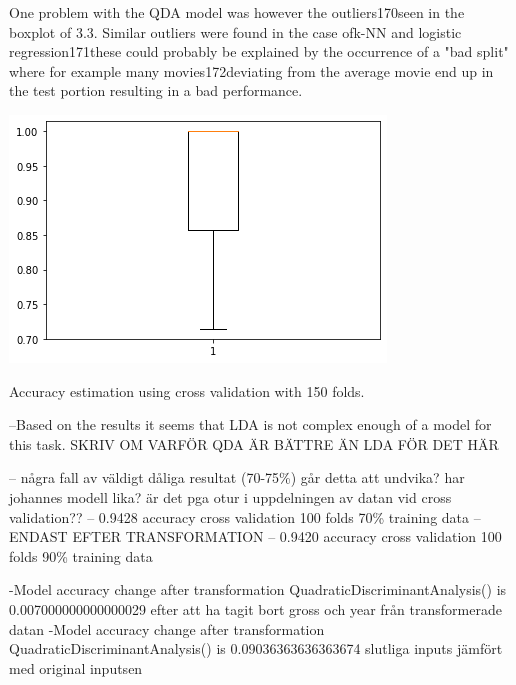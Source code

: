 \documentclass[../../project.tex]{subfiles}
\begin{document}
	One problem with the QDA model was however the outliers170seen in the boxplot of 3.3. Similar outliers were found in the case ofk-NN and logistic regression171these could probably be explained by the occurrence of a "bad split" where for example many movies172deviating from the average movie end up in the test portion resulting in a bad performance.
	
	\begin{table}[]
		\centering
    	\includegraphics[scale=0.7]{project/tex/QDAboxplot.png}
		\caption{Accuracy estimation using cross validation with 150 folds.}
		\label{tbl:boxplotQDA}
    \end{table}
    
    
	--Based on the results it seems that LDA is not complex enough of a model for this task. SKRIV OM VARFÖR QDA ÄR BÄTTRE ÄN LDA FÖR DET HÄR

	-- några fall av väldigt dåliga resultat (70-75\%) går detta att undvika? har johannes modell lika? är det pga otur i uppdelningen av datan vid cross validation??
	-- 0.9428 accuracy cross validation 100 folds 70\% training data
	-- ENDAST EFTER TRANSFORMATION
	-- 0.9420 accuracy cross validation 100 folds 90\% training data
	
	-Model accuracy change after transformation QuadraticDiscriminantAnalysis() is 
0.007000000000000029 efter att ha tagit bort gross och year från transformerade datan
-Model accuracy change after transformation QuadraticDiscriminantAnalysis() is 
0.09036363636363674 slutliga inputs jämfört med original inputsen
\end{document}
